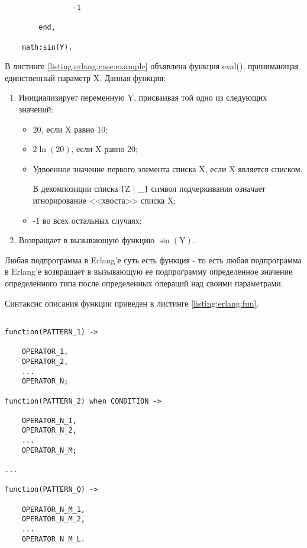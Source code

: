 \begin{itemize}
\begin{lstlisting}
				-1

		end,

	math:sin(Y).

\end{lstlisting}
\mylistingend

		В листинге \ref{listing:erlang:case:example} объявлена функция eval(), принимающая единственный параметр X. Данная функция:

		\begin{enumerate}

			\item Инициализирует переменную Y, присваивая той одно из следующих значений:

			\begin{itemize}

				\item 20, если X равно 10;
				\item $2\ln(20)$, если X равно 20;
				\item Удвоенное значение первого элемента списка X, если X является списком.

					В декомпозиции списка \verb|[|Z | \_\verb|]| символ подчеркивания означает игнорирование <<хвоста>> списка X;

				\item -1 во всех остальных случаях;

			\end{itemize}

			\item Возвращает в вызывающую функцию $\sin(\text{Y})$.

		\end{enumerate}

\end{itemize}


Любая подпрограмма в Erlang'е суть есть функция - то есть любая подпрограмма в Erlang'е возвращает в вызывающую ее подпрограмму определенное значение определенного типа после определенных операций над своими параметрами.

Синтаксис описания функции приведен в листинге \ref{listing:erlang:fun}.

\begin{lstlisting}

function(PATTERN_1) ->

	OPERATOR_1,
	OPERATOR_2,
	...
	OPERATOR_N;

function(PATTERN_2) when CONDITION ->

	OPERATOR_N_1,
	OPERATOR_N_2,
	...
	OPERATOR_N_M;

...

function(PATTERN_Q) ->

	OPERATOR_N_M_1,
	OPERATOR_N_M_2,
	...
	OPERATOR_N_M_L.

\end{lstlisting}
\mylistingend

